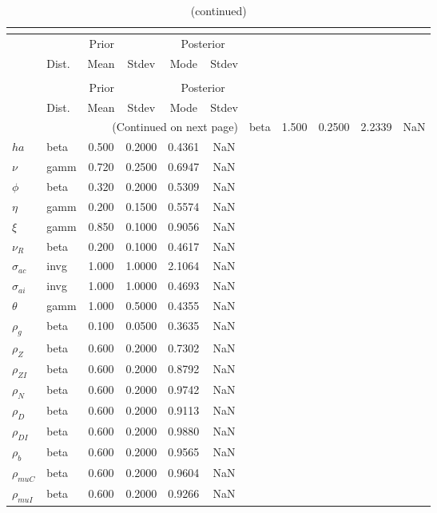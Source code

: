  
\begin{center}
\begin{longtable}{llcccc} 
\caption{Results from posterior maximization (parameters)}\\
 \label{Table:Posterior:1}\\
\toprule 
  & \multicolumn{3}{c}{Prior}  &  \multicolumn{2}{c}{Posterior} \\
  \cmidrule(r{.75em}){2-4} \cmidrule(r{.75em}){5-6}
  & Dist. & Mean  & Stdev & Mode & Stdev \\ 
\midrule \endfirsthead 
\caption{(continued)}\\
 \bottomrule 
  & \multicolumn{3}{c}{Prior}  &  \multicolumn{2}{c}{Posterior} \\
  \cmidrule(r{.75em}){2-4} \cmidrule(r{.75em}){5-6}
  & Dist. & Mean  & Stdev & Mode & Stdev \\ 
\midrule \endhead 
\bottomrule \multicolumn{6}{r}{(Continued on next page)}\endfoot 
\bottomrule\endlastfoot 
${\sigma}$ & beta &   1.500 & 0.2500 &   2.2339 &     NaN \\ 
${ha}$ & beta &   0.500 & 0.2000 &   0.4361 &     NaN \\ 
$\nu$ & gamm &   0.720 & 0.2500 &   0.6947 &     NaN \\ 
${\phi}$ & beta &   0.320 & 0.2000 &   0.5309 &     NaN \\ 
${\eta}$ & gamm &   0.200 & 0.1500 &   0.5574 &     NaN \\ 
$\xi$ & gamm &   0.850 & 0.1000 &   0.9056 &     NaN \\ 
${\nu_R}$ & beta &   0.200 & 0.1000 &   0.4617 &     NaN \\ 
${\sigma_{ac}}$ & invg &   1.000 & 1.0000 &   2.1064 &     NaN \\ 
${\sigma_{ai}}$ & invg &   1.000 & 1.0000 &   0.4693 &     NaN \\ 
${\theta}$ & gamm &   1.000 & 0.5000 &   0.4355 &     NaN \\ 
${\rho_g}$ & beta &   0.100 & 0.0500 &   0.3635 &     NaN \\ 
${\rho_Z}$ & beta &   0.600 & 0.2000 &   0.7302 &     NaN \\ 
${\rho_{ZI}}$ & beta &   0.600 & 0.2000 &   0.8792 &     NaN \\ 
${\rho_N}$ & beta &   0.600 & 0.2000 &   0.9742 &     NaN \\ 
${\rho_D}$ & beta &   0.600 & 0.2000 &   0.9113 &     NaN \\ 
${\rho_{DI}}$ & beta &   0.600 & 0.2000 &   0.9880 &     NaN \\ 
${\rho_b}$ & beta &   0.600 & 0.2000 &   0.9565 &     NaN \\ 
${\rho_{muC}}$ & beta &   0.600 & 0.2000 &   0.9604 &     NaN \\ 
${\rho_{muI}}$ & beta &   0.600 & 0.2000 &   0.9266 &     NaN \\ 
\end{longtable}
 \end{center}
